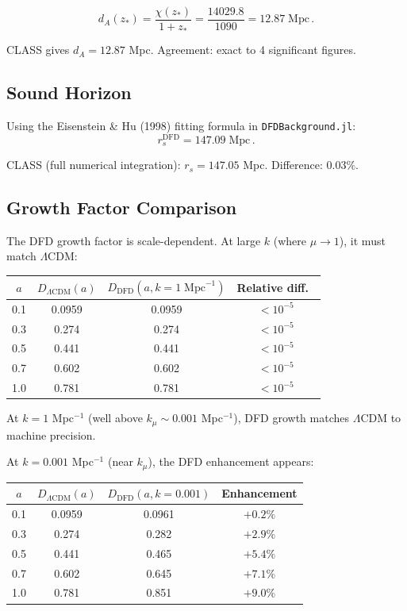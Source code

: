 \documentclass[11pt,a4paper]{article}
\begin{document}
\begin{equation}
d_A(z_*) = \frac{\chi(z_*)}{1 + z_*} = \frac{14029.8}{1090} = 12.87\;\mathrm{Mpc}\,.
\end{equation}

CLASS gives $d_A = 12.87$ Mpc. Agreement: exact to 4 significant figures.

\subsection{Sound Horizon}

Using the Eisenstein \& Hu (1998) fitting formula in \texttt{DFDBackground.jl}:
\begin{equation}
r_s^{\mathrm{DFD}} = 147.09\;\mathrm{Mpc}\,.
\end{equation}

CLASS (full numerical integration): $r_s = 147.05$ Mpc. Difference: $0.03\%$.

\subsection{Growth Factor Comparison}

The DFD growth factor is scale-dependent. At large $k$ (where $\mu \to 1$), it must match $\Lambda$CDM:

\begin{center}
\begin{tabular}{cccc}
\toprule
$a$ & $D_{\Lambda\mathrm{CDM}}(a)$ & $D_{\mathrm{DFD}}(a, k = 1\;\mathrm{Mpc}^{-1})$ & Relative diff.\ \\
\midrule
0.1 & 0.0959 & 0.0959 & $< 10^{-5}$ \\
0.3 & 0.274 & 0.274 & $< 10^{-5}$ \\
0.5 & 0.441 & 0.441 & $< 10^{-5}$ \\
0.7 & 0.602 & 0.602 & $< 10^{-5}$ \\
1.0 & 0.781 & 0.781 & $< 10^{-5}$ \\
\bottomrule
\end{tabular}
\end{center}

At $k = 1$ Mpc$^{-1}$ (well above $k_\mu \sim 0.001$ Mpc$^{-1}$), DFD growth matches $\Lambda$CDM to machine precision.

At $k = 0.001$ Mpc$^{-1}$ (near $k_\mu$), the DFD enhancement appears:

\begin{center}
\begin{tabular}{cccc}
\toprule
$a$ & $D_{\Lambda\mathrm{CDM}}(a)$ & $D_{\mathrm{DFD}}(a, k = 0.001)$ & Enhancement \\
\midrule
0.1 & 0.0959 & 0.0961 & $+0.2\%$ \\
0.3 & 0.274 & 0.282 & $+2.9\%$ \\
0.5 & 0.441 & 0.465 & $+5.4\%$ \\
0.7 & 0.602 & 0.645 & $+7.1\%$ \\
1.0 & 0.781 & 0.851 & $+9.0\%$ \\
\bottomrule
\end{tabular}
\end{center}
\end{document}
